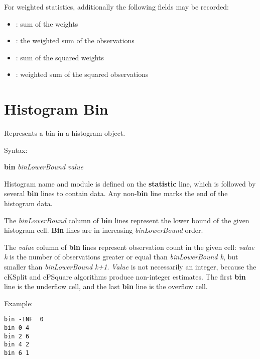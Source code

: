 For weighted statistics, additionally the following fields may be recorded:

\begin{itemize}
    \item {}: sum of the weights
    \item {}: the weighted sum of the observations
    \item {}:  sum of the squared weights
    \item {}: weighted sum of the squared observations
\end{itemize}



\section{Histogram Bin}

Represents a bin in a histogram object.

Syntax:

\hspace{20mm} \textbf{bin} \textit{binLowerBound} \textit{value}

Histogram name and module is defined on the \textbf{statistic} line,
which is followed by several \textbf{bin} lines to contain data. Any
non{}-\textbf{bin} line marks the end of the histogram data.

The \textit{binLowerBound }column of \textbf{bin} lines represent the
lower bound of the given histogram cell. \textbf{Bin} lines are in
increasing \textit{binLowerBound} order.

The \textit{value} column of \textbf{bin} lines represent observation
count in the given cell: \textit{value k} is the number of observations
greater or equal than \textit{binLowerBound k}, but smaller than
\textit{binLowerBound k+1}. \textit{Value} is not necessarily an
integer, because the cKSplit and cPSquare algorithms produce
non{}-integer estimates. The first \textbf{bin} line is the underflow
cell, and the last \textbf{bin} line is the overflow cell.


Example:

\begin{verbatim}
bin -INF  0
bin 0 4
bin 2 6
bin 4 2
bin 6 1
\end{verbatim}


